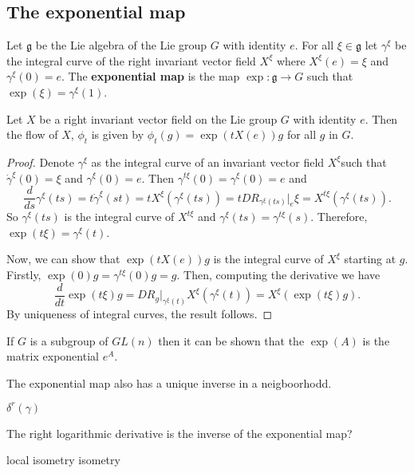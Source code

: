 \subsection{The exponential map}

\begin{definition}
  Let  \(\mathfrak{g}\) be the Lie algebra of the Lie group  \(G\) with identity  \(e\). For all  \(\xi \in \mathfrak{g}\) let  \(\gamma^{\xi}\) be the integral curve of the right invariant vector field  \(X^{\xi}\) where  \(X^\xi (e)=\xi\) and  \(\gamma^\xi(0) = e\). The \textbf{exponential map} is the map  \(\exp : \mathfrak{g} \rightarrow G\) such that  \(\exp(\xi) = \gamma^\xi(1)\).
\end{definition}
\begin{proposition}
  Let  \(X\) be a right invariant vector field on the Lie group  \(G\) with identity  \(e\). Then the flow of  \(X\),  \(\phi_t\) is given by  \(\phi_t(g) = \exp(tX(e))g\) for all  \(g\) in  \(G\).
\end{proposition}
\begin{proof}
  Denote  \(\gamma^{\xi}\) as the integral curve of an  invariant vector field  \(X^{\xi}\)such that  \(\dot{\gamma}^{\xi}(0) = \xi\) and  \(\gamma^\xi(0)=e\). Then  \(\gamma^{t\xi}(0) =  \gamma^{\xi}(0)=e\) and
  \begin{equation}
    \frac{d}{ds}\gamma^{\xi}(ts) = t\dot\gamma^{\xi}(st)=tX^\xi(\gamma^{\xi}(ts)) = t D R_{\gamma^\xi(ts)} \vert_{e} \xi = X^{t\xi}(\gamma^{\xi}(ts)).
  \end{equation}
  So  \(\gamma^\xi(ts)\) is the integral curve of  \(X^{t\xi}\) and  \(\gamma^\xi(ts)=\gamma^{t\xi}(s)\). Therefore,   \(\exp(t\xi) = \gamma^{\xi}(t)\).

  Now, we can show that  \(\exp(tX(e))g\) is the integral curve of  \(X^{\xi}\) starting at  \(g\). Firstly,  \(\exp(0)g = \gamma^{t\xi}(0)g=g\). Then, computing the derivative we have
  \begin{equation}
    \frac{d}{dt} \exp(t\xi)g = D R_g \vert_{\gamma^\xi(t)} X^\xi(\gamma^\xi(t)) = X^\xi(\exp(t\xi)g).
  \end{equation}
  By uniqueness of integral curves, the result follows.
\end{proof}
\begin{remark}
  If  \(G\) is a subgroup of  \(GL(n)\) then it can be shown that the  \(\exp(A)\) is the matrix exponential  \(e^{A}\).
\end{remark}


The exponential map also has a unique inverse in a neigboorhodd.
\begin{definition}
  \(\delta^r(\gamma)\)
\end{definition}
\begin{proposition}
  The right logarithmic derivative is the inverse of the exponential map?
\end{proposition}
local isometry 
isometry 



